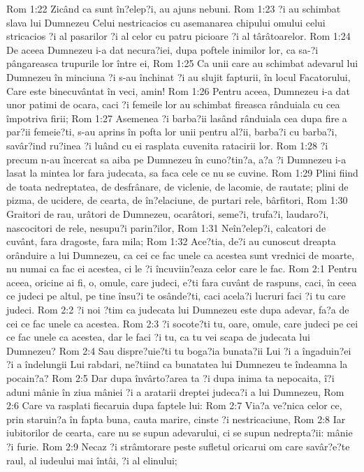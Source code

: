 Rom 1:22  Zicând ca sunt în?elep?i, au ajuns nebuni.
Rom 1:23  ?i au schimbat slava lui Dumnezeu Celui nestricacios cu asemanarea chipului omului celui stricacios ?i al pasarilor ?i al celor cu patru picioare ?i al târâtoarelor.
Rom 1:24  De aceea Dumnezeu i-a dat necura?iei, dupa poftele inimilor lor, ca sa-?i pângareasca trupurile lor între ei,
Rom 1:25  Ca unii care au schimbat adevarul lui Dumnezeu în minciuna ?i s-au închinat ?i au slujit fapturii, în locul Facatorului, Care este binecuvântat în veci, amin!
Rom 1:26  Pentru aceea, Dumnezeu i-a dat unor patimi de ocara, caci ?i femeile lor au schimbat fireasca rânduiala cu cea împotriva firii;
Rom 1:27  Asemenea ?i barba?ii lasând rânduiala cea dupa fire a par?ii femeie?ti, s-au aprins în pofta lor unii pentru al?ii, barba?i cu barba?i, savâr?ind ru?inea ?i luând cu ei rasplata cuvenita ratacirii lor.
Rom 1:28  ?i precum n-au încercat sa aiba pe Dumnezeu în cuno?tin?a, a?a ?i Dumnezeu i-a lasat la mintea lor fara judecata, sa faca cele ce nu se cuvine.
Rom 1:29  Plini fiind de toata nedreptatea, de desfrânare, de viclenie, de lacomie, de rautate; plini de pizma, de ucidere, de cearta, de în?elaciune, de purtari rele, bârfitori,
Rom 1:30  Graitori de rau, urâtori de Dumnezeu, ocarâtori, seme?i, trufa?i, laudaro?i, nascocitori de rele, nesupu?i parin?ilor,
Rom 1:31  Neîn?elep?i, calcatori de cuvânt, fara dragoste, fara mila;
Rom 1:32  Ace?tia, de?i au cunoscut dreapta orânduire a lui Dumnezeu, ca cei ce fac unele ca acestea sunt vrednici de moarte, nu numai ca fac ei acestea, ci le ?i încuviin?eaza celor care le fac.
Rom 2:1  Pentru aceea, oricine ai fi, o, omule, care judeci, e?ti fara cuvânt de raspuns, caci, în ceea ce judeci pe altul, pe tine însu?i te osânde?ti, caci acela?i lucruri faci ?i tu care judeci.
Rom 2:2  ?i noi ?tim ca judecata lui Dumnezeu este dupa adevar, fa?a de cei ce fac unele ca acestea.
Rom 2:3  ?i socote?ti tu, oare, omule, care judeci pe cei ce fac unele ca acestea, dar le faci ?i tu, ca tu vei scapa de judecata lui Dumnezeu?
Rom 2:4  Sau dispre?uie?ti tu boga?ia bunata?ii Lui ?i a îngaduin?ei ?i a îndelungii Lui rabdari, ne?tiind ca bunatatea lui Dumnezeu te îndeamna la pocain?a?
Rom 2:5  Dar dupa învârto?area ta ?i dupa inima ta nepocaita, î?i aduni mânie în ziua mâniei ?i a aratarii dreptei judeca?i a lui Dumnezeu,
Rom 2:6  Care va rasplati fiecaruia dupa faptele lui:
Rom 2:7  Via?a ve?nica celor ce, prin staruin?a în fapta buna, cauta marire, cinste ?i nestricaciune,
Rom 2:8  Iar iubitorilor de cearta, care nu se supun adevarului, ci se supun nedrepta?ii: mânie ?i furie.
Rom 2:9  Necaz ?i strâmtorare peste sufletul oricarui om care savâr?e?te raul, al iudeului mai întâi, ?i al elinului;
